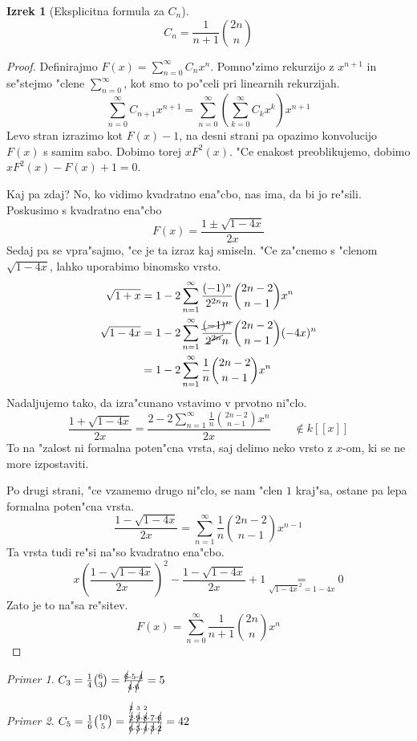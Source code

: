 \documentclass[a4paper,12pt]{article}
\theoremstyle{definition}
\newtheorem{theorem}[counter]{Izrek}
\theoremstyle{remark}
\newtheorem*{ex}{Primer}
\begin{document}
\begin{theorem}[Eksplicitna formula za $C_n$]
	\[C_n = \frac{1}{n + 1} \binom{2n}{n}\]
\end{theorem}
\begin{proof}
	Definirajmo $F(x) = \sum_{n = 0}^{\infty} C_n x^n$.
	Pomno"zimo rekurzijo z $x^{n + 1}$ in se"stejmo "clene $\sum_{n = 0}^{\infty}$, kot smo to po"celi pri linearnih rekurzijah.
	\[\sum_{n = 0}^{\infty} C_{n + 1} x^{n + 1} = \sum_{n = 0}^{\infty} (\sum_{k = 0}^{\infty} C_k x^k) x^{n + 1}\]
	Levo stran izrazimo kot $F(x) - 1$, na desni strani pa opazimo konvolucijo $F(x)$ s samim sabo. Dobimo torej $x F^2(x)$. "Ce enakost preoblikujemo, dobimo $x F^2(x) - F(x) + 1 = 0$.

	Kaj pa zdaj? No, ko vidimo kvadratno ena"cbo, nas ima, da bi jo re"sili. Poskusimo s kvadratno ena"cbo
	\[F(x) = \frac{1 \pm \sqrt{1 - 4x}}{2x}\]
	Sedaj pa se vpra"sajmo, "ce je ta izraz kaj smiseln. "Ce za"cnemo s "clenom $\sqrt{1-4x}$, lahko uporabimo binomsko vrsto.
	\begin{align*}
		\sqrt{1 + x} &= 1 - 2\sum_{n = 1}^{\infty} \frac{(-1)^n}{2^{2n}n} \binom{2n - 2}{n - 1} x^n\\
		\sqrt{1 - 4x} &= 1 - 2\sum_{n = 1}^{\infty} \frac{\cancel{(-1)^n}}{\cancel{2^{2n}}n} \binom{2n - 2}{n - 1} (-4x)^n\\
		&= 1 - 2\sum_{n = 1}^{\infty} \frac{1}{n} \binom{2n - 2}{n - 1} x^n
	\end{align*}
	Nadaljujemo tako, da izra"cunano vstavimo v prvotno ni"clo.
	\[\frac{1 + \sqrt{1 - 4x}}{2x} = \frac{2 - 2\sum_{n = 1}^{\infty} \frac{1}{n} \binom{2n - 2}{n - 1} x^n}{2x} \qquad \notin k[[x]] \]
	To na "zalost ni formalna poten"cna vrsta, saj delimo neko vrsto z $x$-om, ki se ne more izpostaviti.

	Po drugi strani, "ce vzamemo drugo ni"clo, se nam "clen $1$ kraj"sa, ostane pa lepa formalna poten"cna vrsta.
	\[\frac{1 - \sqrt{1 - 4x}}{2x} = \sum_{n = 1}^{\infty} \frac{1}{n} \binom{2n - 2}{n - 1} x^{n - 1}\]
	Ta vrsta tudi re"si na"so kvadratno ena"cbo.
	\[x (\frac{1 - \sqrt{1 - 4x}}{2x})^2 - \frac{1 - \sqrt{1 - 4x}}{2x} + 1 \underset{\sqrt{1 - 4x}^2 = 1 - 4x}{=} 0\]
	Zato je to na"sa re"sitev.
	\[F(x) = \sum_{n = 0}^{\infty} \frac{1}{n + 1} \binom{2n}{n} x^n\]
\end{proof}

\begin{ex}
	$C_3 = \frac{1}{4} \binom{6}{3} = \frac{\cancel{6} \cdot 5 \cdot \cancel{4}}{\cancel{4} \cdot \cancel{6}} = 5$
\end{ex}
\begin{ex}
	$C_5 = \frac{1}{6} \binom{10}{5} = \frac{\overset{\cancel{2}}{\cancel{2}} \cdot \overset{3}{\cancel{9}} \cdot \overset{2}{\cancel{8}} \cdot 7 \cdot \cancel{6}}{\cancel{6} \cdot \cancel{5} \cdot \cancel{4} \cdot \cancel{3} \cdot \cancel{2}} = 42$
\end{ex}
\end{document}

